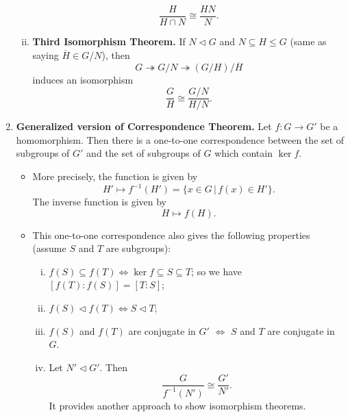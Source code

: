 \begin{enumerate}[(1)]
\begin{enumerate}[(i)]
\begin{equation*}
			\frac{H}{H\cap N} \cong \frac{HN}{N}.
		\end{equation*}
		\item \textbf{Third Isomorphism Theorem.} If $N\lhd G$ and $N\subseteq H\leq G$ (same as saying $\overline{H}\in G/N$), then $$G\twoheadrightarrow G/N \twoheadrightarrow (G/H)/\overline{H}$$ induces an isomorphism
		\begin{equation*}
			\frac{G}{H} \cong \frac{G/N}{H/N}.
		\end{equation*}
	\end{enumerate}
	\item \textbf{Generalized version of Correspondence Theorem.} Let $f: G\rightarrow G'$ be a homomorphism. Then there is a one-to-one correspondence between the set of subgroups of $G'$ and the set of subgroups of $G$ which contain $\operatorname{ker}f$.
	\begin{itemize}
		\item More precisely, the function is given by
		\begin{equation*}
			H'\mapsto f^{-1}(H') = \{x\in G\,|\, f(x)\in H'\}.
		\end{equation*}
		The inverse function is given by
		\begin{equation*}
			H\mapsto f(H).
		\end{equation*}
		\item This one-to-one correspondence also gives the following properties (assume $S$ and $T$ are subgroups):
		\begin{enumerate}[(i)]
			\item $f(S)\subseteq f(T)\Leftrightarrow \operatorname{ker} f \subseteq S\subseteq T$; so we have $[f(T):f(S)] = [T:S]$;
			\item $f(S)\lhd f(T) \Leftrightarrow S\lhd T$;
			\item $f(S)$ and $f(T)$ are conjugate in $G'$ $\Leftrightarrow$ $S$ and $T$ are conjugate in $G$.
			\item Let $N'\lhd G'$. Then
			\begin{equation*}
				\frac{G}{f^{-1}(N')} \cong \frac{G'}{N'}.
			\end{equation*}
			It provides another approach to show isomorphism theorems.
		\end{enumerate}
	\end{itemize}
\end{enumerate}
